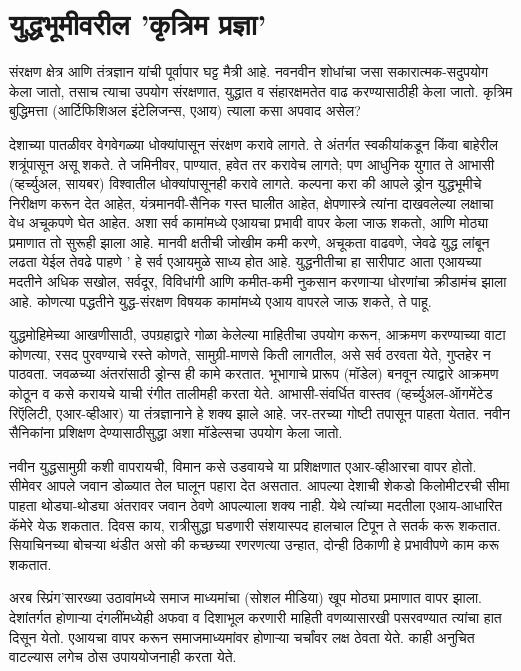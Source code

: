 \chapter{युद्धभूमीवरील 'कृत्रिम प्रज्ञा'}

संरक्षण क्षेत्र आणि तंत्रज्ञान यांची पूर्वापार घट्ट मैत्री आहे. नवनवीन शोधांचा जसा सकारात्मक-सदुपयोग केला जातो, तसाच त्याचा उपयोग संरक्षणात, युद्धात व संहारक्षमतेत वाढ करण्यासाठीही केला जातो. कृत्रिम बुद्धिमत्ता (आर्टिफिशिअल इंटेलिजन्स, एआय) त्याला कसा अपवाद असेल?

देशाच्या पातळीवर वेगवेगळ्या धोक्यांपासून संरक्षण करावे लागते. ते अंतर्गत स्वकीयांकडून किंवा बाहेरील शत्रूंपासून असू शकते. ते जमिनीवर, पाण्यात, हवेत तर करावेच लागते; पण आधुनिक युगात ते आभासी (व्हर्च्युअल, सायबर) विश्वातील धोक्यांपासूनही करावे लागते. कल्पना करा की आपले ड्रोन युद्धभूमीचे निरीक्षण करून देत आहेत, यंत्रमानवी-सैनिक गस्त घालीत आहेत, क्षेपणास्त्रे त्यांना दाखवलेल्या लक्षाचा वेध अचूकपणे घेत आहेत. अशा सर्व कामांमध्ये एआयचा प्रभावी वापर केला जाऊ शकतो, आणि मोठ्या प्रमाणात तो सुरूही झाला आहे. मानवी क्षतीची जोखीम कमी करणे, अचूकता वाढवणे, जेवढे युद्ध लांबून लढता येईल तेवढे पाहणे ' हे सर्व एआयमुळे साध्य होत आहे. युद्धनीतीचा हा सारीपाट आता एआयच्या मदतीने अधिक सखोल, सर्वदूर, विविधांगी आणि कमीत-कमी नुकसान करणाऱ्या धोरणांचा क्रीडामंच झाला आहे. कोणत्या पद्धतीने युद्ध-संरक्षण विषयक कामांमध्ये एआय वापरले जाऊ शकते, ते पाहू.

युद्धमोहिमेच्या आखणीसाठी, उपग्रहाद्वारे गोळा केलेल्या माहितीचा उपयोग करून, आक्रमण करण्याच्या वाटा कोणत्या, रसद पुरवण्याचे रस्ते कोणते, सामुग्री-माणसे किती लागतील, असे सर्व ठरवता येते, गुप्तहेर न पाठवता. जवळच्या अंतरांसाठी ड्रोन्स ही कामे करतात. भूभागाचे प्रारूप (मॉडेल) बनवून त्याद्वारे आक्रमण कोठून व कसे करायचे याची रंगीत तालीमही करता येते. आभासी-संवर्धित वास्तव (व्हर्च्युअल-ऑगमेंटेड रिऍलिटी, एआर-व्हीआर) या तंत्रज्ञानाने हे शक्य झाले आहे. जर-तरच्या गोष्टी तपासून पाहता येतात. नवीन सैनिकांना प्रशिक्षण देण्यासाठीसुद्धा अशा मॉडेल्सचा उपयोग केला जातो.

नवीन युद्धसामुग्री कशी वापरायची, विमान कसे उडवायचे या प्रशिक्षणात एआर-व्हीआरचा वापर होतो. सीमेवर आपले जवान डोळ्यात तेल घालून पहारा देत असतात. आपल्या देशाची शेकडो किलोमीटरची सीमा पाहता थोड्या-थोड्या अंतरावर जवान ठेवणे आपल्याला शक्य नाही. येथे त्यांच्या मदतीला एआय-आधारित कॅमेरे येऊ शकतात. दिवस काय, रात्रीसुद्धा घडणारी संशयास्पद हालचाल टिपून ते सतर्क करू शकतात. सियाचिनच्या बोचऱ्या थंडीत असो की कच्छच्या रणरणत्या उन्हात, दोन्ही ठिकाणी हे प्रभावीपणे काम करू शकतात. 

अरब स्प्रिंग'सारख्या उठावांमध्ये समाज माध्यमांचा (सोशल मीडिया) खूप मोठ्या प्रमाणात वापर झाला. देशांतर्गत होणाऱ्या दंगलींमध्येही अफवा व दिशाभूल करणारी माहिती वणव्यासारखी पसरवण्यात त्यांचा हात दिसून येतो. एआयचा वापर करून समाजमाध्यमांवर होणाऱ्या चर्चांवर लक्ष ठेवता येते. काही अनुचित वाटल्यास लगेच ठोस उपाययोजनाही करता येते. 

